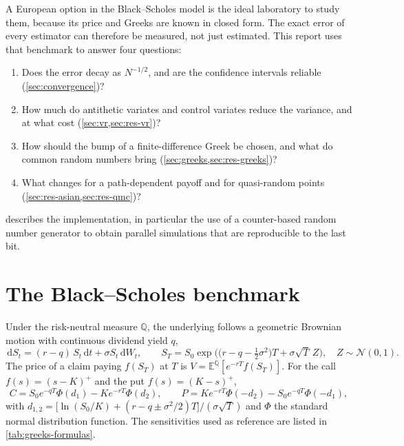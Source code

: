 \documentclass[11pt,a4paper]{article}
\newcommand{\E}{\mathbb{E}}
\newcommand{\Q}{\mathbb{Q}}
\newcommand{\N}{\mathcal{N}}
\newcommand{\1}{\mathbf{1}}
\newcommand{\dd}{\,\mathrm{d}}
\theoremstyle{plain}
\theoremstyle{remark}
\begin{document}
A European option in the Black--Scholes model \citep{black1973,merton1973} is the ideal laboratory to study
them, because its price and Greeks are known in closed form. The exact error of every estimator can therefore
be measured, not just estimated. This report uses that benchmark to answer four questions:
\begin{enumerate}[nosep]
  \item Does the error decay as $N^{-1/2}$, and are the confidence intervals reliable (\cref{sec:convergence})?
  \item How much do antithetic variates and control variates reduce the variance, and at what cost
        (\cref{sec:vr,sec:res-vr})?
  \item How should the bump of a finite-difference Greek be chosen, and what do common random numbers bring
        (\cref{sec:greeks,sec:res-greeks})?
  \item What changes for a path-dependent payoff and for quasi-random points (\cref{sec:res-asian,sec:res-qmc})?
\end{enumerate}
 describes the implementation, in particular the use of a counter-based random number
generator to obtain parallel simulations that are reproducible to the last bit.

\section{The Black--Scholes benchmark}\label{sec:bs}

Under the risk-neutral measure $\Q$, the underlying follows a geometric Brownian motion with continuous
dividend yield $q$,
\begin{equation}
  \dd S_t = (r - q)\, S_t \dd t + \sigma S_t \dd W_t,
  \qquad
  S_T = S_0 \exp\!\Big( \big(r - q - \tfrac{1}{2}\sigma^2\big) T + \sigma \sqrt{T}\, Z \Big),
  \quad Z \sim \N(0,1).
  \label{eq:gbm}
\end{equation}
The price of a claim paying $f(S_T)$ at $T$ is $V = \E^{\Q}[e^{-rT} f(S_T)]$. For the call
$f(s) = (s-K)^+$ and the put $f(s) = (K-s)^+$,
\begin{equation}
  C = S_0 e^{-qT} \Phi(d_1) - K e^{-rT} \Phi(d_2), \qquad
  P = K e^{-rT} \Phi(-d_2) - S_0 e^{-qT} \Phi(-d_1),
  \label{eq:bs}
\end{equation}
with $d_{1,2} = \big[\ln(S_0/K) + (r - q \pm \sigma^2/2) T\big] / (\sigma\sqrt{T})$ and $\Phi$ the standard
normal distribution function. The sensitivities used as reference are listed in \cref{tab:greeks-formulas}.
\end{document}
